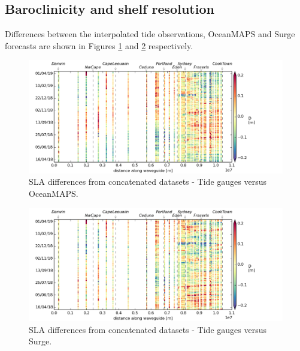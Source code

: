 \subsection{ Baroclinicity and shelf resolution }
Differences between the interpolated tide observations, OceanMAPS and Surge forecasts are shown in Figures \ref{fig:diff_tide_omaps} and \ref{fig:diff_tide_surge} respectively.
\newcommand\CAPTIONc{SLA differences from concatenated datasets}
\begin{figure}[H]\centering
    \noindent\includegraphics[width=\figwidthFull]{figures/plots/interpTdiff_obs_sla_day0_d0.png}
    \caption{\CAPTIONc{} - Tide gauges versus OceanMAPS.}
    \label{fig:diff_tide_omaps}
\end{figure}

\begin{figure}[H]\centering
    \noindent\includegraphics[width=\figwidthFull]{figures/plots/interpTdiff_obs_surgeg_day0_d0.png}
    \caption{\CAPTIONc{} - Tide gauges versus Surge.}
    \label{fig:diff_tide_surge}
\end{figure}

